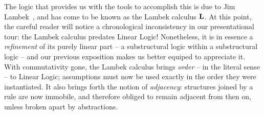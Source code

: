The logic that provides us with the tools to accomplish this is due to Jim Lambek~\cite{lambek1958mathematics}, and has come to be known as the Lambek calculus $\textbf{L}$.
At this point, the careful reader will notice a chronological inconsistency in our presentational tour: the Lambek calculus predates Linear Logic! 
Nonetheless, it is in essence a \textit{refinement} of its purely linear part -- a substructural logic within a substructural logic -- and our previous exposition makes us better equiped to appreciate it.
With commutativity gone, the Lambek calculus brings \textit{order} -- in the literal sense -- to Linear Logic; assumptions must now be used exactly in the order they were instantiated.
It also brings forth the notion of \textit{adjacency}: structures joined by a rule are now immobile, and therefore obliged to remain adjacent from then on, unless broken apart by abstractions.

